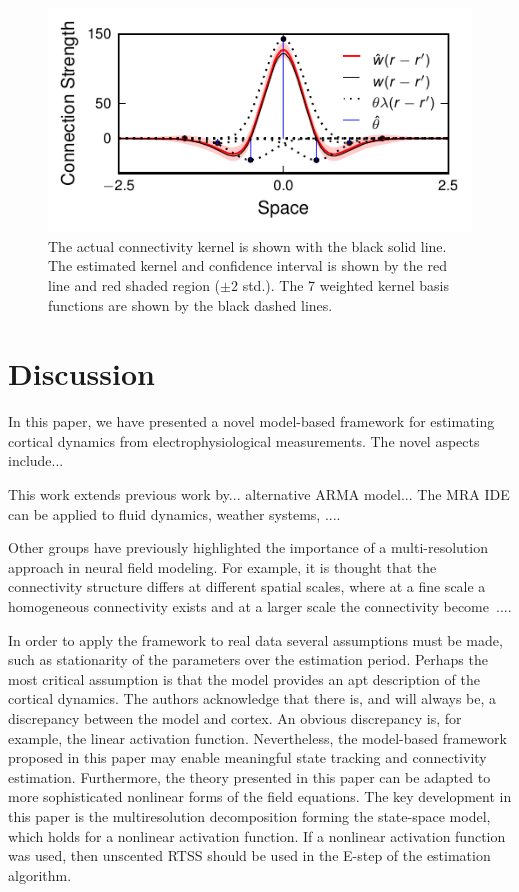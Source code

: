 \documentclass[journal,a4paper]{IEEEtran}
\begin{document}
\begin{figure}[!h] 
	\centering
		\includegraphics[scale=1]{./Graph/Kernel.pdf}
		\caption{The actual connectivity kernel is shown with the black solid line. The estimated kernel and confidence interval is shown by the red line and red shaded region ($\pm2$ std.). The 7 weighted kernel basis functions are shown by the black dashed lines.}
	\label{fig:KernelEstimate}
\end{figure}
\section{Discussion}
In this paper, we have presented a novel model-based framework for estimating cortical dynamics from electrophysiological measurements. The novel aspects include...

This work extends previous work by... alternative ARMA model... The MRA IDE can be applied to fluid dynamics, weather systems, ....

Other groups have previously highlighted the importance of a multi-resolution approach in neural field modeling. For example, it is thought that the connectivity structure differs at different spatial scales, where at a fine scale a homogeneous connectivity exists and at a larger scale the connectivity become~\cite{Qubbaj2009}....

In order to apply the framework to real data several assumptions must be made, such as stationarity of the parameters over the estimation period. Perhaps the most critical assumption is that the model provides an apt description of the cortical dynamics. The authors acknowledge that there is, and will always be, a discrepancy between the model and cortex. An obvious discrepancy is, for example, the linear activation function. Nevertheless, the model-based framework proposed in this paper may enable meaningful state tracking and connectivity estimation. Furthermore, the theory presented in this paper can be adapted to more sophisticated nonlinear forms of the field equations. The key development in this paper is the multiresolution decomposition forming the state-space model, which holds for a nonlinear activation function. If a nonlinear activation function was used, then unscented RTSS should be used in the E-step of the estimation algorithm. 
\end{document}
